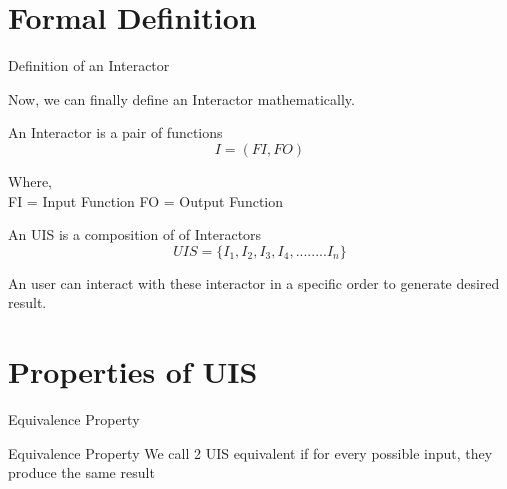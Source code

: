 \documentclass{beamer}
\begin{document}
\section{Formal Definition}
\begin{frame}{Definition of an Interactor}
	
	Now, we can finally define an Interactor mathematically.
	\begin{block}{An Interactor is a pair of functions}
		$$ I = (FI,FO) $$
	\end{block}
	
	Where,\\
	 FI = Input Function 
	 FO = Output Function
	 
	 
	\pause
	\begin{block}{An UIS is a composition of of Interactors}
		$$ UIS =  \{I_1,I_2,I_3,I_4,........I_n\}  $$
	\end{block}
	An user can interact with these interactor in a specific order to generate desired result.
	
\end{frame}




	\section{Properties of UIS}
	
	\begin{frame}{Equivalence Property}
		\begin{block}{Equivalence Property}
		We call 2 UIS equivalent if for every possible input, they produce the same result
		\end{block}
	 
	\end{frame}
   	
\end{document}
